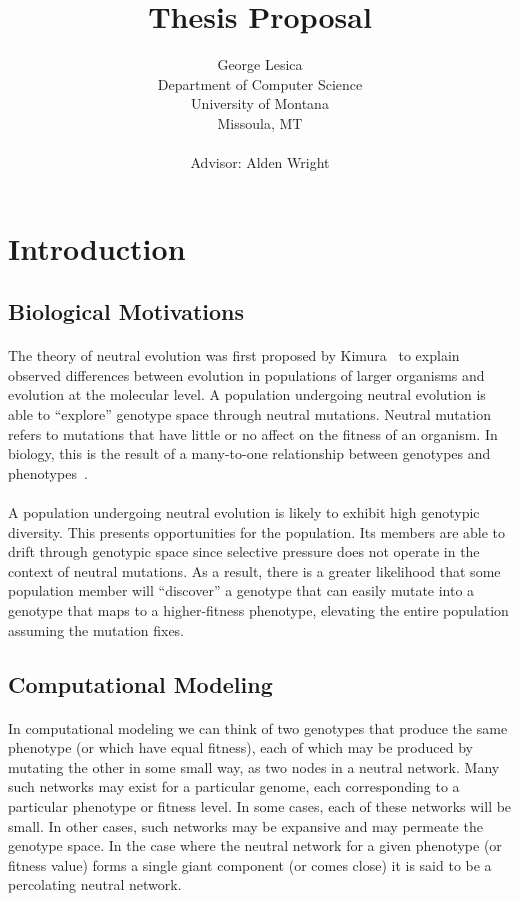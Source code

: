 \documentclass[12pt,letterpaper,titlepage,draft]{article}
\title{Thesis Proposal}
\author{George Lesica\\
Department of Computer Science\\
University of Montana\\
Missoula, MT\\
\\
Advisor: Alden Wright}
\begin{document}
\maketitle

\section{Introduction}

\subsection{Biological Motivations}

\paragraph{}
The theory of neutral evolution was first proposed by Kimura~\cite{Kimura1984}
to explain observed differences between evolution in populations of larger
organisms and evolution at the molecular level. A population undergoing
neutral evolution is able to ``explore'' genotype space through neutral
mutations. Neutral mutation refers to mutations that have little or no affect
on the fitness of an organism. In biology, this is the result of a many-to-one
relationship between genotypes and phenotypes~\cite{Newman1998}.

\paragraph{}
A population undergoing neutral evolution is likely to exhibit high genotypic
diversity. This presents opportunities for the population. Its members are able
to drift through genotypic space since selective pressure does not operate in
the context of neutral mutations. As a result, there is a greater likelihood
that some population member will ``discover'' a genotype that can easily mutate
into a genotype that maps to a higher-fitness phenotype, elevating the entire
population assuming the mutation fixes.

\subsection{Computational Modeling}

\paragraph{}
In computational modeling we can think of two genotypes that produce the same
phenotype (or which have equal fitness), each of which may be produced by
mutating the other in some small way, as two nodes in a neutral network. Many
such networks may exist for a particular genome, each corresponding to a
particular phenotype or fitness level. In some cases, each of these networks
will be small. In other cases, such networks may be expansive and may permeate
the genotype space. In the case where the neutral network for a given phenotype
(or fitness value) forms a single giant component (or comes close) it is said
to be a percolating neutral network.
\end{document}
